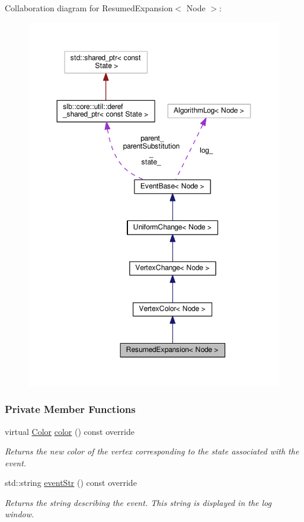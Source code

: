 Collaboration diagram for Resumed\+Expansion$<$ Node $>$\+:\nopagebreak
\begin{figure}[H]
\begin{center}
\leavevmode
\includegraphics[width=350pt]{structResumedExpansion__coll__graph}
\end{center}
\end{figure}
\subsubsection*{Private Member Functions}
\begin{DoxyCompactItemize}
\item 
virtual \hyperlink{colors_8h_ab87bacfdad76e61b9412d7124be44c1c}{Color} \hyperlink{structResumedExpansion_afb6f30343497e1361a86d9657f528936}{color} () const override
\begin{DoxyCompactList}\small\item\em Returns the new color of the vertex corresponding to the state associated with the event. \end{DoxyCompactList}\item 
std\+::string \hyperlink{structResumedExpansion_a31e613f75a1a4d2d0bd66a3378c8c32d}{event\+Str} () const override
\begin{DoxyCompactList}\small\item\em Returns the string describing the event. This string is displayed in the log window. \end{DoxyCompactList}\end{DoxyCompactItemize}
